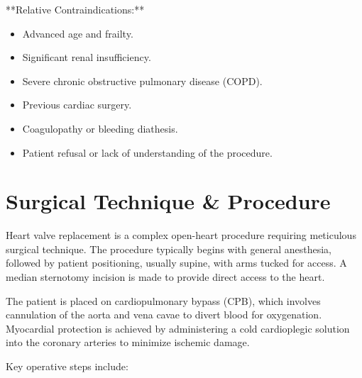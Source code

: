 **Relative Contraindications:**

\begin{itemize}
  \item Advanced age and frailty.
  \item Significant renal insufficiency.
  \item Severe chronic obstructive pulmonary disease (COPD).
  \item Previous cardiac surgery.
  \item Coagulopathy or bleeding diathesis.
  \item Patient refusal or lack of understanding of the procedure.
\end{itemize}

\section*{Surgical Technique \& Procedure}
Heart valve replacement is a complex open-heart procedure requiring meticulous surgical technique. The procedure typically begins with general anesthesia, followed by patient positioning, usually supine, with arms tucked for access. A median sternotomy incision is made to provide direct access to the heart.

The patient is placed on cardiopulmonary bypass (CPB), which involves cannulation of the aorta and vena cavae to divert blood for oxygenation. Myocardial protection is achieved by administering a cold cardioplegic solution into the coronary arteries to minimize ischemic damage.

Key operative steps include:

